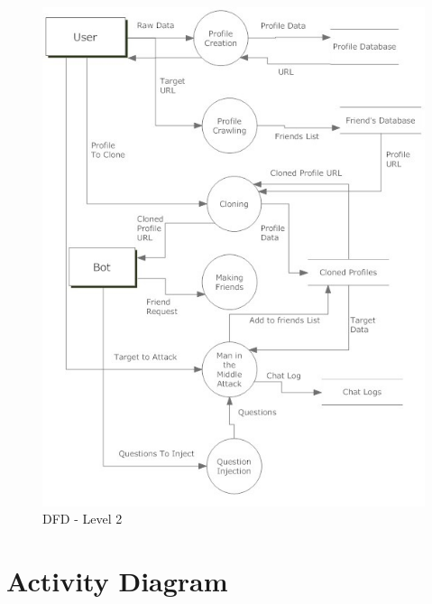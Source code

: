 \begin{figure}[H]
\centering
\includegraphics[scale=0.8]{project/diagrams/dfd2}
\caption{DFD - Level 2}
\label{fig:dfd2}
\end{figure}

\section{Activity Diagram}

